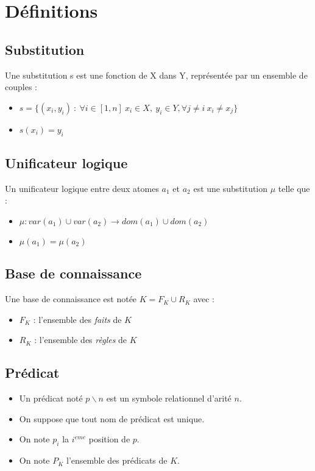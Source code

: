 \section{D\'efinitions}

\subsection{Substitution}
	Une substitution s est une fonction de X dans Y, repr\'esent\'ee par un ensemble de couples :
	\begin{itemize}
		\item $s = \{(x_{i},y_{i})\ :\ \forall i \in [1,n]\ x_{i} \in X,\ y_{i} \in Y, \forall j \neq i\ x_{i} \neq x_{j}\}$
		\item $s(x_{i}) = y_{i}$
	\end{itemize}

\subsection{Unificateur logique}
	Un unificateur logique entre deux atomes $a_{1}$ et $a_{2}$ est une substitution $\mu$ telle que :
	\begin{itemize}
		\item $\mu : var(a_{1}) \cup var(a_{2}) \rightarrow dom(a_{1}) \cup dom(a_{2})$
		\item $\mu(a_{1}) = \mu(a_{2})$
	\end{itemize}

\subsection{Base de connaissance}
	Une base de connaissance est not\'ee $K = F_{K} \cup R_{K}$ avec :
	\begin{itemize}
		\item $F_{K}$ : l'ensemble des {\em faits} de $K$
		\item $R_{K}$ : l'ensemble des {\em r\`egles} de $K$
	\end{itemize}

\subsection{Pr\'edicat}
	\begin{itemize}
		\item Un pr\'edicat not\'e $p \backslash n$ est un symbole relationnel d'arit\'e $n$.
		\item On suppose que tout nom de pr\'edicat est unique.
		\item On note $p_{i}$ la $i^{eme}$ position de $p$.
		\item On note $P_{K}$ l'ensemble des pr\'edicats de $K$.
	\end{itemize}

